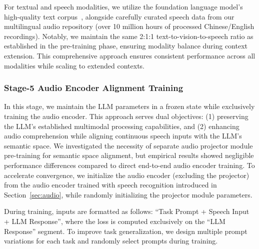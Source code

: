 \documentclass{article}
\begin{document}
For textual and speech modalities, we utilize the foundation language model's high-quality text corpus~\citep{meituan2025longcat_flash_chat}, alongside carefully curated speech data from our multilingual audio repository (over 10 million hours of processed Chinese/English recordings). Notably, we maintain the same 2:1:1 text-to-vision-to-speech ratio as established in the pre-training phase, ensuring modality balance during context extension. This comprehensive approach ensures consistent performance across all modalities while scaling to extended contexts.

\subsubsection{Stage-5 Audio Encoder Alignment Training}
\label{subsec:stage-5}

In this stage, we maintain the LLM parameters in a frozen state while exclusively training the audio encoder. 
This approach serves dual objectives: (1) preserving the LLM's established multimodal processing capabilities, and (2) enhancing audio comprehension while aligning continuous speech inputs with the LLM's semantic space. 
We investigated the necessity of separate audio projector module pre-training for semantic space alignment, but empirical results showed negligible performance differences compared to direct end-to-end audio encoder training. 
To accelerate convergence, we initialize the audio encoder (excluding the projector) from the audio encoder trained with speech recognition introduced in Section~\ref{sec:audio}, while randomly initializing the projector module parameters.

During training, inputs are formatted as follows: ``Task Prompt + Speech Input + LLM Response'', where the loss is computed exclusively on the ``LLM Response'' segment. 
To improve task generalization, we design multiple prompt variations for each task and randomly select prompts during training.
\end{document}

